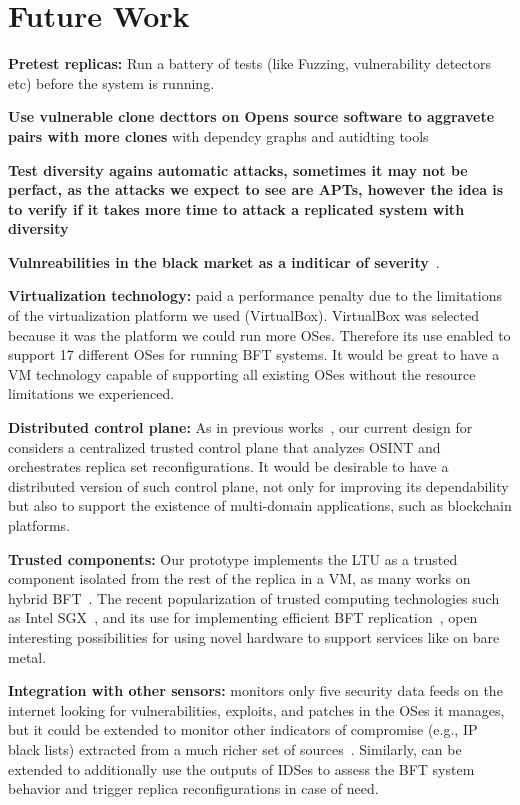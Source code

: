 \section{Future Work}

\textbf{Pretest replicas:}
Run a battery of tests (like Fuzzing, vulnerability detectors etc) before the system is running.

\textbf{Use vulnerable clone decttors on Opens source software to aggravete pairs with more clones} with dependcy graphs and autidting tools~\cite{Kim:2017}

\textbf{Test diversity agains automatic attacks, sometimes it may not be perfact, as the attacks we expect to see are APTs, however the idea is to verify if it takes more time to attack a replicated system with diversity}~\cite{Hu:2015}

\textbf{Vulnreabilities in the black market as a inditicar of severity}~\cite{Allodi:2014}.

\textbf{Virtualization technology:}
\system paid a performance penalty due to the limitations of the virtualization platform we used (VirtualBox).
VirtualBox was selected because it was the platform we could run more OSes.
Therefore its use enabled \system to support 17 different OSes for running BFT systems.
It would be great to have a VM technology capable of supporting all existing OSes without the resource limitations we experienced.

\textbf{Distributed control plane:}
As in previous works~\cite{Roeder:2010,Platania:2014}, our current design for \system considers a centralized trusted control plane that analyzes OSINT and orchestrates replica set reconfigurations.
It would be desirable to have a distributed version of such control plane, not only for improving its dependability but also to support the existence of multi-domain applications, such as blockchain platforms.

\textbf{Trusted components:}
Our prototype implements the LTU as a trusted component isolated from the rest of the replica in a VM, as many works on hybrid BFT~\cite{Veronese:2013,Roeder:2010,Platania:2014,Sousa:2010,Distler:2011}.
The recent popularization of trusted computing technologies such as Intel SGX~\cite{sgx}, and its use for implementing efficient BFT replication~\cite{Behl:2017}, open interesting possibilities for using novel hardware to support services like \system on bare metal.

\textbf{Integration with other sensors:}
\system monitors only five security data feeds on the internet looking for vulnerabilities, exploits, and patches in the OSes it manages, but it could be extended to monitor other indicators of compromise (e.g., IP black lists) extracted from a much richer set of sources~\cite{Liao:2016,Sabottke:2015}.
Similarly, \system can be extended to additionally use the outputs of IDSes to assess the BFT system behavior and trigger replica reconfigurations in case of need.

